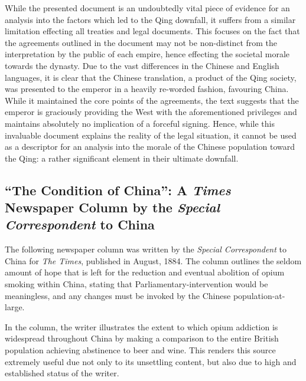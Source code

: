 \documentclass{article}
\begin{document}
While the presented document is an undoubtedly vital piece of evidence for an analysis into the factors which led to the Qing downfall, it suffers from a similar limitation effecting all treaties and legal documents. This focuses on the fact that the agreements outlined in the document may not be non-distinct from the interpretation by the public of each empire, hence effecting the societal morale towards the dynasty. Due to the vast differences in the Chinese and English languages, it is clear that the Chinese translation, a product of the Qing society, was presented to the emperor in a heavily re-worded fashion, favouring China. While it maintained the core points of the agreements, the text suggests that the emperor is graciously providing the West with the aforementioned privileges and maintains absolutely no implication of a forceful signing. Hence, while this invaluable document explains the reality of the legal situation, it cannot be used as a descriptor for an analysis into the morale of the Chinese population toward the Qing: a rather significant element in their ultimate downfall.

\subsection{``The Condition of China'': A \textit{Times} Newspaper Column by the \textit{Special Correspondent} to China}

The following newspaper column was written by the \textit{Special Correspondent} to China for \textit{The Times}, published in August, 1884. The column outlines the seldom amount of hope that is left for the reduction and eventual abolition of opium smoking within China, stating that Parliamentary-intervention would be meaningless, and any changes must be invoked by the Chinese population-at-large.



In the column, the writer illustrates the extent to which opium addiction is widespread throughout China by making a comparison to the entire British population achieving abstinence to beer and wine. This renders this source extremely useful due not only to its unsettling content, but also due to high and established status of the writer.
\end{document}
